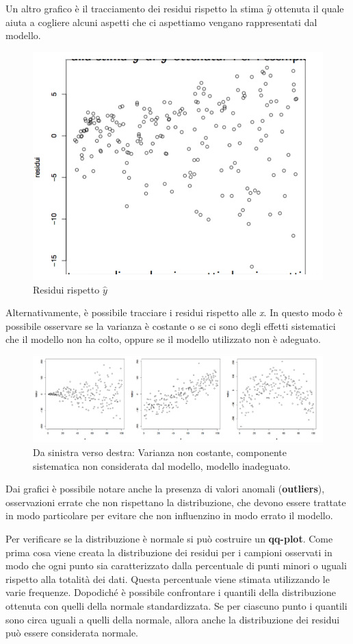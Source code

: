 Un altro grafico è il tracciamento dei residui rispetto la stima $ \hat{y} $ ottenuta il quale aiuta a cogliere alcuni aspetti che ci aspettiamo vengano rappresentati dal modello.

\begin{figure}[htbp]
\centering
\includegraphics[width=.5\textwidth]{./notes/immagini/l6-fig12-1.png}
\caption{Residui rispetto $ \hat{y} $}
\end{figure}

Alternativamente, è possibile tracciare i residui rispetto alle \textit{x}. In questo modo è possibile osservare se la varianza è costante o se ci sono degli effetti sistematici che il modello non ha colto, oppure se il modello utilizzato non è adeguato.

\begin{figure}[htbp]
	\centering
	\includegraphics[width=\textwidth]{./notes/immagini/l6-fig13-1.png}
	\caption{Da sinistra verso destra: Varianza non costante, componente sistematica non considerata dal modello, modello inadeguato.}
\end{figure}


Dai grafici è possibile notare anche la presenza di valori anomali (\textbf{outliers}), osservazioni errate che non rispettano la distribuzione, che devono essere trattate in modo particolare per evitare che non influenzino in modo errato il modello.

Per verificare se la distribuzione è normale si può costruire un \textbf{qq-plot}.
Come prima cosa viene creata la distribuzione dei residui per i campioni osservati in modo che ogni punto sia caratterizzato dalla percentuale di punti minori o uguali rispetto alla totalità dei dati. Questa percentuale viene stimata utilizzando le varie frequenze.
Dopodiché è possibile confrontare i quantili della distribuzione ottenuta con quelli della normale standardizzata. Se per ciascuno punto i quantili sono circa uguali a quelli della normale, allora anche la distribuzione dei residui può essere considerata normale.

